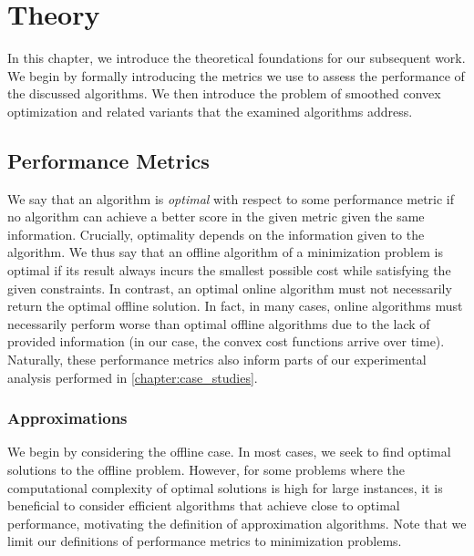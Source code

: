 
\chapter{Theory}\label{chapter:theory}

In this chapter, we introduce the theoretical foundations for our subsequent work. We begin by formally introducing the metrics we use to assess the performance of the discussed algorithms. We then introduce the problem of smoothed convex optimization and related variants that the examined algorithms address.

\section{Performance Metrics}\label{section:theory:performance_metrics}

We say that an algorithm is \emph{optimal} with respect to some performance metric if no algorithm can achieve a better score in the given metric given the same information. Crucially, optimality depends on the information given to the algorithm. We thus say that an offline algorithm of a minimization problem is optimal if its result always incurs the smallest possible cost while satisfying the given constraints. In contrast, an optimal online algorithm must not necessarily return the optimal offline solution. In fact, in many cases, online algorithms must necessarily perform worse than optimal offline algorithms due to the lack of provided information (in our case, the convex cost functions arrive over time). Naturally, these performance metrics also inform parts of our experimental analysis performed in \autoref{chapter:case_studies}.

\subsection{Approximations}

We begin by considering the offline case. In most cases, we seek to find optimal solutions to the offline problem. However, for some problems where the computational complexity of optimal solutions is high for large instances, it is beneficial to consider efficient algorithms that achieve close to optimal performance, motivating the definition of approximation algorithms. Note that we limit our definitions of performance metrics to minimization problems.

